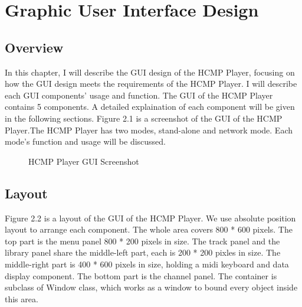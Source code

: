 
\chapter{Graphic User Interface Design} %

\section{Overview}
In this chapter, I will describe the GUI design of the HCMP Player, focusing 
on how the GUI design meets the requirements of the HCMP Player. I will describe
each GUI components' 
usage and function. The GUI of the HCMP Player contains 5 components.
A detailed explaination of each component will be given in the following sections. 
Figure 2.1 is a screenshot of the GUI of the HCMP Player.The HCMP Player has 
two modes, 
stand-alone and network mode. Each mode's function and usage will be discussed.

\begin{figure}[H]
\caption{HCMP Player GUI Screenshot}
\label{fig:speciation}
\end{figure}

\section{Layout}
Figure 2.2 is a layout of the GUI of the HCMP Player. We use absolute position layout 
to arrange each component. The whole area 
covers 800 * 600 pixels. The top part is the menu panel 800 * 200 pixels 
in size. The track panel and 
the library panel share the middle-left part, each is 200 * 200 pixles in size. 
The middle-right part is 400 * 600 pixels in size, holding a midi keyboard and data 
display component. The bottom part is the channel panel. The container is subclass of
Window class, which works as a window to bound every object inside this area. 


